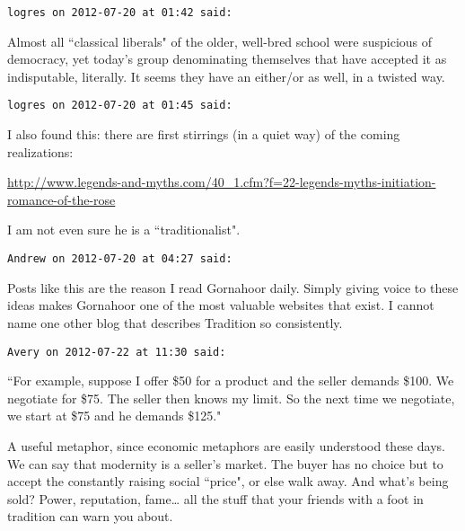\begin{footnotesize}\begin{sffamily}



\texttt{logres on 2012-07-20 at 01:42 said: }

Almost all ``classical liberals" of the older, well-bred school were suspicious of democracy, yet today's group denominating themselves that have accepted it as indisputable, literally. It seems they have an either/or as well, in a twisted way.


\hfill

\texttt{logres on 2012-07-20 at 01:45 said: }

I also found this: there are first stirrings (in a quiet way) of the coming realizations:

\url{http://www.legends-and-myths.com/40\_1.cfm?f=22-legends-myths-initiation-romance-of-the-rose}

I am not even sure he is a ``traditionalist".


\hfill

\texttt{Andrew on 2012-07-20 at 04:27 said: }

Posts like this are the reason I read Gornahoor daily. Simply giving voice to these ideas makes Gornahoor one of the most valuable websites that exist. I cannot name one other blog that describes Tradition so consistently.


\hfill

\texttt{Avery on 2012-07-22 at 11:30 said: }

``For example, suppose I offer \$50 for a product and the seller demands \$100. We negotiate for \$75. The seller then knows my limit. So the next time we negotiate, we start at \$75 and he demands \$125."

A useful metaphor, since economic metaphors are easily understood these days. We can say that modernity is a seller's market. The buyer has no choice but to accept the constantly raising social ``price", or else walk away. And what's being sold? Power, reputation, fame… all the stuff that your friends with a foot in tradition can warn you about.


\end{sffamily}\end{footnotesize}
